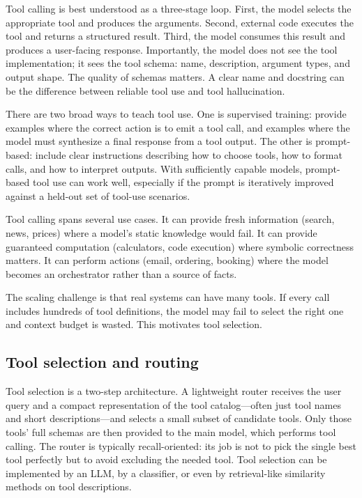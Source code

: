 Tool calling is best understood as a three-stage loop. First, the model selects the appropriate tool and produces the arguments. Second, external code executes the tool and returns a structured result. Third, the model consumes this result and produces a user-facing response. Importantly, the model does not see the tool implementation; it sees the tool schema: name, description, argument types, and output shape. The quality of schemas matters. A clear name and docstring can be the difference between reliable tool use and tool hallucination.

There are two broad ways to teach tool use. One is supervised training: provide examples where the correct action is to emit a tool call, and examples where the model must synthesize a final response from a tool output. The other is prompt-based: include clear instructions describing how to choose tools, how to format calls, and how to interpret outputs. With sufficiently capable models, prompt-based tool use can work well, especially if the prompt is iteratively improved against a held-out set of tool-use scenarios.

Tool calling spans several use cases. It can provide fresh information (search, news, prices) where a model’s static knowledge would fail. It can provide guaranteed computation (calculators, code execution) where symbolic correctness matters. It can perform actions (email, ordering, booking) where the model becomes an orchestrator rather than a source of facts.

The scaling challenge is that real systems can have many tools. If every call includes hundreds of tool definitions, the model may fail to select the right one and context budget is wasted. This motivates tool selection.

\subsection{Tool selection and routing}
Tool selection is a two-step architecture. A lightweight router receives the user query and a compact representation of the tool catalog—often just tool names and short descriptions—and selects a small subset of candidate tools. Only those tools’ full schemas are then provided to the main model, which performs tool calling. The router is typically recall-oriented: its job is not to pick the single best tool perfectly but to avoid excluding the needed tool. Tool selection can be implemented by an LLM, by a classifier, or even by retrieval-like similarity methods on tool descriptions.

